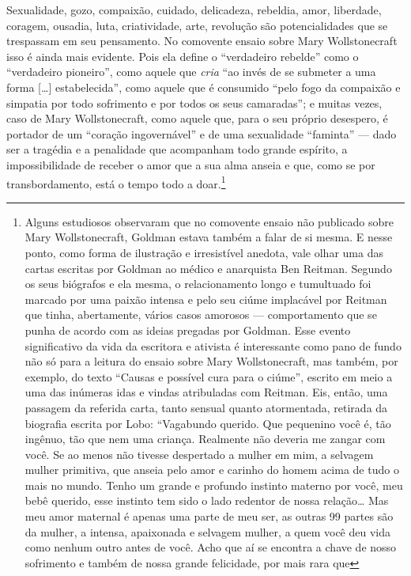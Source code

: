 Sexualidade, gozo,
compaixão, cuidado, delicadeza, rebeldia, amor, liberdade, coragem,
ousadia, luta, criatividade, arte, revolução são potencialidades que se
trespassam em seu pensamento. No comovente ensaio sobre Mary Wollstonecraft isso é
ainda mais evidente. Pois ela define o ``verdadeiro rebelde'' como o
``verdadeiro pioneiro'', como aquele que \emph{cria} ``ao invés de se
submeter a uma forma {[}\ldots{]} estabelecida'', como aquele que é
consumido ``pelo fogo da compaixão e simpatia por todo sofrimento e por
todos os seus camaradas''; e muitas vezes, caso de Mary Wollstonecraft,
como aquele que, para o seu próprio desespero, é portador de um
``coração ingovernável'' e de uma sexualidade ``faminta'' ---
dado ser a tragédia e a penalidade que acompanham todo grande espírito,
a impossibilidade de receber o amor que a sua alma anseia e que, como se
por transbordamento, está o tempo todo a doar.\footnote{Alguns
  estudiosos observaram que no comovente ensaio não publicado sobre Mary
  Wollstonecraft, Goldman estava também a falar de si
  mesma. E nesse ponto, como forma de ilustração e irresistível anedota,
  vale olhar uma das cartas escritas por Goldman ao médico e
  anarquista Ben Reitman. Segundo os seus biógrafos e ela mesma, o
  relacionamento longo e tumultuado foi marcado por uma paixão intensa
  e pelo seu ciúme implacável por Reitman que
  tinha, abertamente, vários casos amorosos --- comportamento que se
  punha de acordo com as ideias pregadas por Goldman. Esse evento
  significativo da vida da escritora e ativista é 
  interessante como pano de fundo não só para a leitura do
  ensaio sobre Mary Wollstonecraft, mas também, por exemplo, do texto
  ``Causas e possível cura para o ciúme'', escrito em meio a
  uma das inúmeras idas e vindas atribuladas com Reitman. Eis, então,
  uma passagem da referida carta, tanto sensual quanto atormentada,
  retirada da biografia escrita por Lobo: ``Vagabundo querido. Que
  pequenino você é, tão ingênuo, tão que nem uma criança. Realmente não
  deveria me zangar com você. Se ao menos não tivesse despertado a
  mulher em mim, a selvagem mulher primitiva, que anseia pelo amor e
  carinho do homem acima de tudo o mais no mundo. Tenho um grande e
  profundo instinto materno por você, meu bebê querido, esse instinto
  tem sido o lado redentor de nossa relação\ldots{} Mas meu amor maternal é
  apenas uma parte de meu ser, as outras 99 partes são da mulher, a
  intensa, apaixonada e selvagem mulher, a quem você deu vida como
  nenhum outro antes de você. Acho que aí se encontra a chave de nosso
  sofrimento e também de nossa grande felicidade, por mais rara que
}

